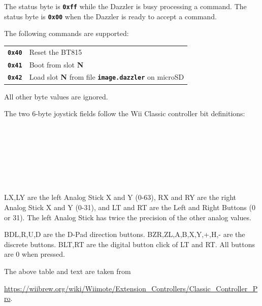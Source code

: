 \documentclass{article}
\newcommand{\mach}[1]{\texttt{\textbf{#1}}}
\newcommand{\gap}{\vspace{10pt}}
\begin{document}
The status byte is \mach{0xff} while the Dazzler is busy processing a command.
The status byte is \mach{0x00}
when the Dazzler is ready to accept a command.

The following commands are supported:

\gap
\begin{tabular}{ll}

\mach{0x40}	& Reset the BT815 \\
\mach{0x41}	& Boot from slot \textbf{N} \\
\mach{0x42}	& Load slot \textbf{N} from file \mach{image.dazzler} on microSD \\

\end{tabular}
\gap

All other byte values are ignored.

The two 6-byte joystick fields follow the Wii Classic controller bit definitions:
\gap
\begin{bytefield}[endianness=big,bitwidth=3.2em]{10}
  \\
  \\
   \\
  \\
\\
\\
\end{bytefield}

LX,LY are the left Analog Stick X and Y (0-63), RX and RY are the right Analog Stick X and Y (0-31), and LT and RT are the Left and Right Buttons (0 or 31). The left Analog Stick has twice the precision of the other analog values.

BD{L,R,U,D} are the D-Pad direction buttons. B{ZR,ZL,A,B,X,Y,+,H,-} are the discrete buttons. B{LT,RT} are the digital button click of LT and RT. All buttons are 0 when pressed.

The above table and text are taken from

\url{https://wiibrew.org/wiki/Wiimote/Extension_Controllers/Classic_Controller_Pro}.
\end{document}
